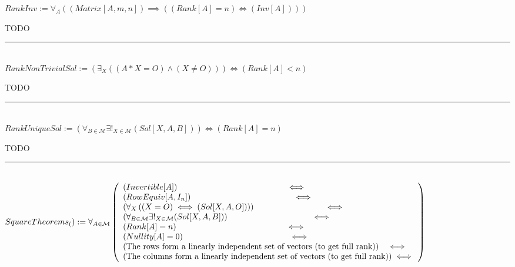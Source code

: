 \documentclass{book}
\newcommand{\abr}{:=}
\newcommand{\pr}[1]{\left(#1\right)}
\begin{document}
$RankInv \abr \forall_{A}\pr{(Matrix[A, m, n]) \implies \pr{(Rank[A] = n) \iff (Inv[A])}}$
\begin{enumerate}
  \lit TODO
\end{enumerate} \vspace{.75mm} \hrule \vspace{.75mm} \ \\ 

$RankNonTrivialSol \abr \pr{\exists_{X}\pr{(A * X = O) \land (X \neq O)}} \iff (Rank[A] < n)$
\begin{enumerate}
  \lit TODO
\end{enumerate} \vspace{.75mm} \hrule \vspace{.75mm} \ \\ 

$RankUniqueSol \abr \pr{\forall_{B \in \mathcal{M}} \exists!_{X \in \mathcal{M}}(Sol[X, A, B])} \iff (Rank[A] = n)$
\begin{enumerate}
  \lit TODO
\end{enumerate} \vspace{.75mm} \hrule \vspace{.75mm} \ \\ 

$SquareTheorems_() \abr \forall_{A \in \mathcal{M}}\left(\begin{array}{ll}
  (Invertible[A]) \hfill \iff \hfill \\
  (RowEquiv[A, I_n]) \hfill \iff \hfill \\
  \pr{\forall_{X}\pr{(X = O) \iff (Sol[X, A, O])}} \hfill \iff \hfill \\
  \pr{\forall_{B \in \mathcal{M}} \exists!_{X \in \mathcal{M}}(Sol[X, A, B])} \hfill \iff \hfill \\
  (Rank[A] = n) \hfill \iff \hfill \\
  (Nullity[A] = 0) \hfill \iff \hfill \\
  \pr{\text{The rows form a linearly independent set of vectors (to get full rank)}} \hfill \iff \hfill \\
  \pr{\text{The columns form a linearly independent set of vectors (to get full rank)}} \hfill \iff \hfill \\
\end{array}\right)$ \\
\end{document}
